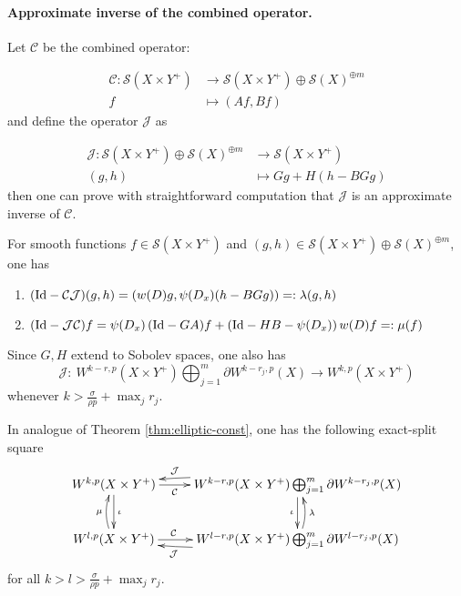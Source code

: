 \paragraph{Approximate inverse of the combined operator.}
\label{sec:orgac1470a}
Let \(\mathcal{C}\) be the combined operator:

\begin{align*}
   \mathcal{C}: \mathcal{S}(X\times Y^+) &\longrightarrow \mathcal{S}(X\times
Y^+)\oplus \mathcal{S}(X)^{\oplus m}\\
f &\longmapsto (Af, Bf)
\end{align*} 
and define the operator \(\mathcal{J}\) as

\begin{align*}
   \mathcal{J}: \mathcal{S}(X\times
Y^+)\oplus \mathcal{S}(X)^{\oplus m} & \longrightarrow  \mathcal{S}(X\times Y^+) \\
(g,h) &\longmapsto Gg+ H(h-BGg)
\end{align*}
then one can prove with straightforward computation that \(\mathcal{J}\) is an
approximate inverse of \(\mathcal{C}\).

\begin{theorem}
\label{thm:approx-inv-C}
For smooth functions \(f\in \mathcal{S}(X\times Y^+)\) and \((g,h)\in
\mathcal{S}(X\times Y^+) \oplus \mathcal{S}(X)^{\oplus m}\), one has
\begin{enumerate}
\item \(({\rm Id} - \mathcal{C}\mathcal{J})(g,h) = (w(D)g, \psi(D_x)(h-BGg))=:\lambda(g,h)\)
\item \(({\rm Id} - \mathcal{J}\mathcal{C})f = \psi(D_x) \left({\rm Id} -GA)f + ({\rm Id} -HB -\psi(D_x)\right)w(D)f=:\mu(f)\)
\end{enumerate}
\end{theorem}

Since \(G,H\) extend to Sobolev spaces, one also has
\[
\mathcal{J}:\ W^{k-r,p}(X\times Y^+)\bigoplus_{j=1}^m \partial W^{k-r_j,p}(X)
\longrightarrow W^{k,p}(X\times Y^+)
\]
whenever \(k > \frac{\sigma}{\rho p} + \max_j r_j\).

\begin{theorem}
\label{thm:exact-half}
In analogue of Theorem \ref{thm:elliptic-const}, one has the following exact-split square
\begin{equation}
\label{eq:elliptic-half}
\xymatrix{
W^{k,p}(X\times Y^+) \ar@{->}[r]_<<<<<{\mathcal{C}} \ar@{->}[d]^{\iota} & W^{k-r,p}(X\times Y^+)\bigoplus_{j=1}^m \partial W^{k-r_j,p}(X) \ar@{->}[d]_{\iota} \ar@/_/@{->}[l]_>>>{\mathcal{J}} \\
W^{l,p}(X\times Y^+) \ar@{->}[r]^<<<<<{\mathcal{C}} \ar@/^/@{->}[u]^{\mu} & W^{l-r,p}(X\times Y^+)\bigoplus_{j=1}^m \partial W^{l-r_j,p}(X) \ar@/^/@{->}[l]^>>>{\mathcal{J}} \ar@/_/@{->}[u]_{\lambda}
}
\end{equation}
for all \(k>l> \frac{\sigma}{\rho p} + \max_j r_j\).
\end{theorem}


